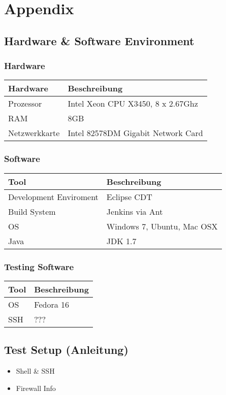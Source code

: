 \section{Appendix}

\subsection{Hardware \& Software Environment}

\subsubsection{Hardware}
\begin{tabular}[ht]{l l}
  Hardware & Beschreibung\\
  \hline
  Prozessor & Intel Xeon CPU X3450, 8 x 2.67Ghz\\
  RAM & 8GB\\
  Netzwerkkarte & Intel 82578DM Gigabit Network Card\\
\end{tabular}

\subsubsection{Software}
\begin{tabular}[ht]{l l}
  Tool & Beschreibung\\
  \hline
  Development Enviroment & Eclipse CDT\\
    Build System & Jenkins via Ant\\
  OS & Windows 7, Ubuntu, Mac OSX\\
  Java & JDK 1.7\\
\end{tabular}

\subsubsection{Testing Software}
\begin{tabular}[ht]{l l}
  Tool & Beschreibung\\
  \hline
  OS & Fedora 16\\
  SSH & ???\\
\end{tabular}

	
\subsection{Test Setup (Anleitung)}
\begin{itemize}
\item Shell \& SSH
\item Firewall Info
\end{itemize}	

